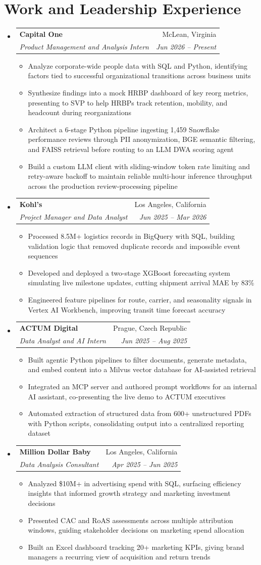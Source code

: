 \documentclass[letterpaper,11pt]{article}
\makeatletter
\newcommand{\resumeItem}[1]{
  \item\small{#1}
}
\newcommand{\resumeSubheading}[4]{
  \vspace{-2pt}\item
    \begin{tabular*}{\textwidth}[t]{l@{\extracolsep{\fill}}r}
      \textbf{#1} & #2 \\
      \textit{\small#3} & \textit{\small #4} \\
    \end{tabular*}\vspace{-7pt}
}
\newcommand{\resumeSubHeadingListStart}{\begin{itemize}[leftmargin=0in, label={}]}
\newcommand{\resumeSubHeadingListEnd}{\end{itemize}}
\newcommand{\resumeItemListStart}{\begin{itemize}[itemsep= 1.5pt, parsep=0pt]}
\newcommand{\resumeItemListEnd}{\end{itemize}\vspace{-5pt}}
\makeatother
\begin{document}
\section{Work and Leadership Experience}
  \resumeSubHeadingListStart
    \resumeSubheading
      {Capital One}{McLean, Virginia}
      {Product Management and Analysis Intern}{Jun 2026 -- Present}
      \resumeItemListStart
        \resumeItem{Analyze corporate-wide people data with SQL and Python, identifying factors tied to successful organizational transitions across business units}
        \resumeItem{Synthesize findings into a mock HRBP dashboard of key reorg metrics, presenting to SVP to help HRBPs track retention, mobility, and headcount during reorganizations}
        \resumeItem{Architect a 6-stage Python pipeline ingesting 1,459 Snowflake performance reviews through PII anonymization, BGE semantic filtering, and FAISS retrieval before routing to an LLM DWA scoring agent}
        \resumeItem{Build a custom LLM client with sliding-window token rate limiting and retry-aware backoff to maintain reliable multi-hour inference throughput across the production review-processing pipeline}
      \resumeItemListEnd
    \resumeSubheading
      {Kohl's}{Los Angeles, California}
      {Project Manager and Data Analyst}{Jun 2025 -- Mar 2026}
      \resumeItemListStart
        \resumeItem{Processed 8.5M+ logistics records in BigQuery with SQL, building validation logic that removed duplicate records and impossible event sequences}
        \resumeItem{Developed and deployed a two-stage XGBoost forecasting system simulating live milestone updates, cutting shipment arrival MAE by 83\%}
        \resumeItem{Engineered feature pipelines for route, carrier, and seasonality signals in Vertex AI Workbench, improving transit time forecast accuracy}
      \resumeItemListEnd
    \resumeSubheading
      {ACTUM Digital}{Prague, Czech Republic}
      {Data Analyst and AI Intern}{Jun 2025 -- Aug 2025}
      \resumeItemListStart
        \resumeItem{Built agentic Python pipelines to filter documents, generate metadata, and embed content into a Milvus vector database for AI-assisted retrieval}
        \resumeItem{Integrated an MCP server and authored prompt workflows for an internal AI assistant, co-presenting the live demo to ACTUM executives}
        \resumeItem{Automated extraction of structured data from 600+ unstructured PDFs with Python scripts, consolidating output into a centralized reporting dataset}
      \resumeItemListEnd
    \resumeSubheading
      {Million Dollar Baby}{Los Angeles, California}
      {Data Analysis Consultant}{Apr 2025 -- Jun 2025}
      \resumeItemListStart
        \resumeItem{Analyzed \$10M+ in advertising spend with SQL, surfacing efficiency insights that informed growth strategy and marketing investment decisions}
        \resumeItem{Presented CAC and RoAS assessments across multiple attribution windows, guiding stakeholder decisions on marketing spend allocation}
        \resumeItem{Built an Excel dashboard tracking 20+ marketing KPIs, giving brand managers a recurring view of acquisition and return trends}
      \resumeItemListEnd
  \resumeSubHeadingListEnd
\end{document}

